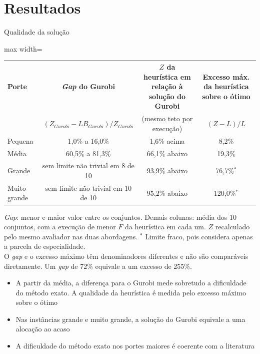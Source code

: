 \documentclass[aspectratio=169,10pt]{beamer}
\newcommand{\framerefs}{}
\newcommand{\slidecites}[1]{\gdef\framerefs{Referências: \cite{#1}}}
\gdef\framerefs{}%
\begin{document}
\section{Resultados}

\begin{frame}{Qualidade da solução}
    \slidecites{ceschia2012modeling, demeester2010hybrid}
    \centering
    \small
    \begin{adjustbox}{max width=\textwidth}
    \begin{tabular}{lccc}
        \toprule
        \textbf{Porte} & \textbf{\textit{Gap} do Gurobi} & \textbf{$Z$ da heurística em relação à solução do Gurobi} & \textbf{Excesso máx. da heurística sobre o ótimo} \\
        & $(Z_{Gurobi} - LB_{Gurobi})/Z_{Gurobi}$ & (mesmo teto por execução) & $(Z - L)/L$ \\
        \midrule
        Pequena      & 1,0\% a 16,0\%        & 1,6\% acima     & 8,2\%        \\
        Média        & 60,5\% a 81,3\%       & 66,1\% abaixo   & 19,3\%       \\
        Grande       & sem limite não trivial em 8 de 10 & 93,9\% abaixo   & 76,7\%$^*$   \\
        Muito grande & sem limite não trivial em 10 de 10 & 95,2\% abaixo  & 120,0\%$^*$  \\
        \bottomrule
    \end{tabular}
    \end{adjustbox}

    \vspace{0.15cm}
    {\scriptsize \textit{Gap}: menor e maior valor entre os conjuntos. Demais colunas: média dos 10 conjuntos, com a execução de menor $F$ da heurística em cada um. $Z$ recalculado pelo mesmo avaliador nas duas abordagens. $^*$ Limite fraco, pois considera apenas a parcela de especialidade.\\ O \textit{gap} e o excesso máximo têm denominadores diferentes e não são comparáveis diretamente. Um \textit{gap} de 72\% equivale a um excesso de 255\%.\par}

    \vspace{0.25cm}
    \normalsize
    \raggedright
    \begin{itemize}
        \item A partir da média, a diferença para o Gurobi mede sobretudo a dificuldade do método exato. A qualidade da heurística é medida pelo excesso máximo sobre o ótimo
        \item Nas instâncias grande e muito grande, a solução do Gurobi equivale a uma alocação ao acaso
        \item A dificuldade do método exato nos portes maiores é coerente com a literatura \cite{ceschia2012modeling, demeester2010hybrid}
    \end{itemize}
\end{frame}
\end{document}
